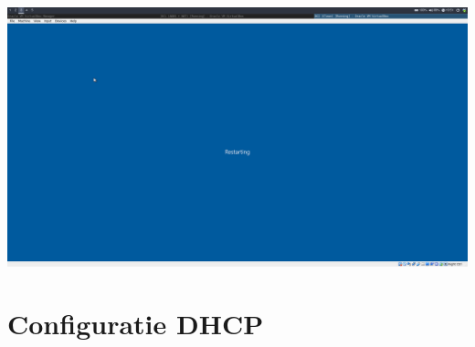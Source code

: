 \documentclass[a4paper]{article}
\begin{document}
\begin{center}
	\includegraphics[width=15cm]{Pictures/DC2/ADDS/1542307904.png}
\end{center}

\section{Configuratie DHCP}
\end{document}
